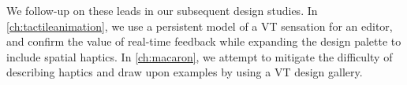 We follow-up on these leads in our subsequent design studies.
In \autoref{ch:tactileanimation}, we use a persistent model of a VT sensation for an editor, and confirm the value of real-time feedback while expanding the design palette to include spatial haptics.
In \autoref{ch:macaron}, we attempt to mitigate the difficulty of describing haptics and draw upon examples by using a VT design gallery.





%
%

